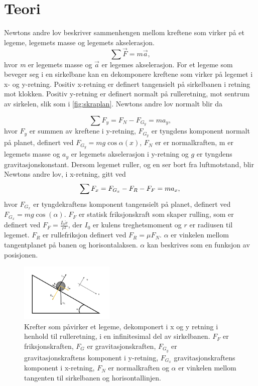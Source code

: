 \section{Teori}
Newtons andre lov beskriver sammenhengen mellom kreftene som virker på et legeme, legemets masse og legemets akselerasjon. 
\begin{equation}
\sum{\vec{F}} = m \vec{a},
\label{eq:Newtons Andre Lov} 
\end{equation}
hvor \textit{m} er legemets masse og $\vec{a}$ er legemes akselerasjon. For et legeme som beveger seg i en sirkelbane kan en dekomponere kreftene som virker på legemet i x- og y-retning. Positiv x-retning er definert tangensielt på sirkelbanen i retning mot klokken. Positiv y-retning er definert normalt på rulleretning, mot sentrum av sirkelen, slik som i \autoref{fig:skraplan}. Newtons andre lov normalt blir da

\begin{equation}
\sum{F_y} = F_{N} - F_{G_y} = m a_y,
\end{equation}
hvor $F_y$ er summen av kreftene i y-retning, $F_{G_y}$ er tyngdens komponent normalt på planet, definert ved $F_{G_y} = mg \cos\alpha(x)$, $F_N$ er er normalkraften, m er legemets masse og $a_y$ er legemets akselerasjon i y-retning og $g$ er tyngdens gravitasjonskonstant. Dersom legemet ruller, og en ser bort fra luftmotstand, blir Newtons andre lov, i x-retning, gitt ved
\begin{equation}
\sum{F_x} = F_{G_x} - F_{R} - F_{F} = m a_x, \\
\end{equation}
hvor $F_{G_x}$ er tyngdekraftens komponent tangensielt på planet, definert ved $F_{G_x} = mg\cos(\alpha)$.  $F_{F}$ er statisk friksjonskraft som skaper rulling, som er definert ved $F_{F} = \frac{I_{0}\ddot{x}}{r^2} $, der $I_{0}$ er kulens treghetsmoment og $r$ er radiusen til legemet.
 $F_{R}$ er rullefriksjon definert ved $F_{R} = \mu F_{N}$. $\alpha$ er vinkelen mellom tangentplanet på banen og horisontalaksen. $\alpha$ kan beskrives som en funksjon av posisjonen. 


\FloatBarrier
\begin{figure}[h!]
\centering
\includegraphics[width=0.4\textwidth]{Lysbilde1.png}

\caption{Krefter som påvirker et legeme, dekomponert i x og y retning i henhold til rulleretning, i en infinitesimal del av sirkelbanen. $F_F$ er friksjonskraften, $F_G$ er gravitasjonskraften, $F_G_y$ er gravitasjonskraftens komponent i y-retning, $F_G_x$ gravitasjonskraftens komponent i x-retning, $F_N$ er normalkraften og $\alpha$ er vinkelen mellom tangenten til sirkelbanen og horisontallinjen.}
\label{fig:skraplan} %
\end{figure}
\FloatBarrier

